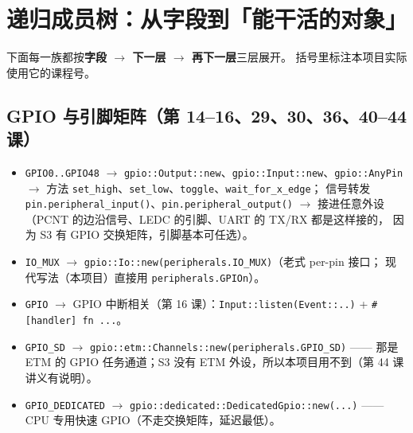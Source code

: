 \documentclass[UTF8,a4paper,11pt,fontset=fandol]{ctexart}
\newcommand{\fld}[1]{\texttt{#1}}
\begin{document}
\newpage
\section{递归成员树：从字段到「能干活的对象」}

下面每一族都按\textbf{字段 $\rightarrow$ 下一层 $\rightarrow$ 再下一层}三层展开。
括号里标注本项目实际使用它的课程号。

\subsection{GPIO 与引脚矩阵（第 14--16、29、30、36、40--44 课）}
\begin{itemize}
  \item \fld{GPIO0..GPIO48} $\rightarrow$
    \fld{gpio::Output::new}、\fld{gpio::Input::new}、\fld{gpio::AnyPin} $\rightarrow$
    方法 \fld{set\_high}、\fld{set\_low}、\fld{toggle}、\fld{wait\_for\_x\_edge}；
    信号转发 \fld{pin.peripheral\_input()}、\fld{pin.peripheral\_output()} $\rightarrow$
    接进任意外设（PCNT 的边沿信号、LEDC 的引脚、UART 的 TX/RX 都是这样接的，
    因为 S3 有 GPIO 交换矩阵，引脚基本可任选）。
  \item \fld{IO\_MUX} $\rightarrow$ \fld{gpio::Io::new(peripherals.IO\_MUX)}（老式 per-pin 接口；
    现代写法（本项目）直接用 \fld{peripherals.GPIOn}）。
  \item \fld{GPIO} $\rightarrow$ GPIO 中断相关（第 16 课）：\fld{Input::listen(Event::..)} +
    \fld{\#[handler] fn ...}。
  \item \fld{GPIO\_SD} $\rightarrow$ \fld{gpio::etm::Channels::new(peripherals.GPIO\_SD)}
    —— 那是 ETM 的 GPIO 任务通道；S3 没有 ETM 外设，所以本项目用不到（第 44 课讲义有说明）。
  \item \fld{GPIO\_DEDICATED} $\rightarrow$ \fld{gpio::dedicated::DedicatedGpio::new(...)}
    —— CPU 专用快速 GPIO（不走交换矩阵，延迟最低）。
\end{itemize}
\end{document}
